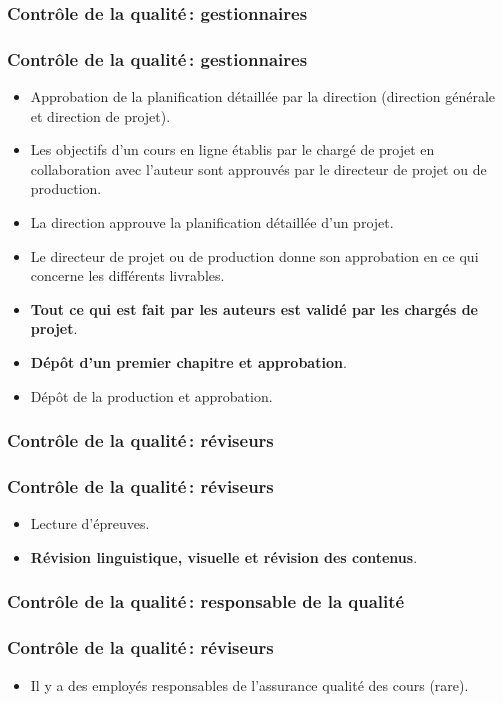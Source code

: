 					\subsubsection{Contrôle de la qualité\,: gestionnaires} 
							\begin{frame}
							\frametitle{Contrôle de la qualité\,: gestionnaires}
                        			
							\begin{itemize}
							\item Approbation de la planification détaillée par la direction (direction générale et direction de projet).
							\item Les objectifs d’un cours en ligne établis par le chargé de projet en collaboration avec l’auteur sont approuvés par le directeur de projet ou de production.
							\item La direction approuve la planification détaillée d’un projet.
							\item Le directeur de projet ou de production donne son approbation en ce qui concerne les différents livrables.
							\item \textbf{Tout ce qui est fait par les auteurs est validé par les chargés de projet}.
							\item \textbf{Dépôt d’un premier chapitre et approbation}.
							\item Dépôt de la production et approbation.
							\end{itemize}						
					\end{frame}	
					
					\subsubsection{Contrôle de la qualité\,: réviseurs} 
							\begin{frame}[allowframebreaks]
							\frametitle{Contrôle de la qualité\,: réviseurs}
                        			
							\begin{itemize}
							\item Lecture d’épreuves.
							\item \textbf{Révision linguistique,  visuelle et révision des contenus}.
							
							\end{itemize}						
					\end{frame}	
					\subsubsection{Contrôle de la qualité\,: responsable de la qualité} 
							\begin{frame}[allowframebreaks]
							\frametitle{Contrôle de la qualité\,: réviseurs}
                        			
							\begin{itemize}
							\item Il y a des employés responsables de l’assurance qualité des cours (rare).
							\end{itemize}						
					\end{frame}	

